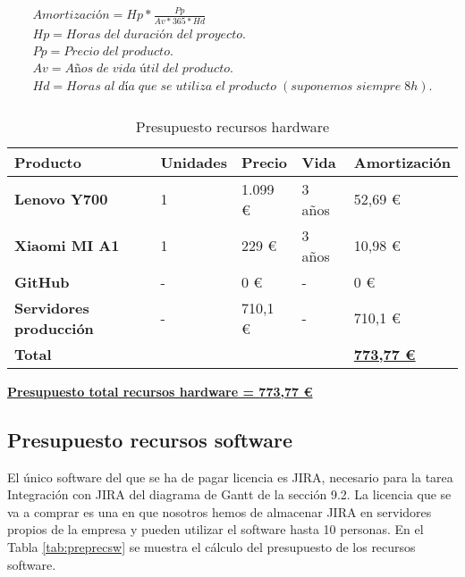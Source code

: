 \label{eq:amortizacion}
\begin{align*}
Amortización = Hp * \frac{Pp}{Av*365*Hd} \\
Hp = Horas \; del \; duración \; del \; proyecto. \\
Pp = Precio \; del \; producto. \\
Av = Años \; de \; vida \; útil \; del \; producto. \\
Hd = Horas \; al \; día \; que \; se \; utiliza \; el \; producto \; (suponemos \; siempre \; 8h). \\
\end{align*}

\begin{table}[H]\label{tab:preprechw}
	\centering
	\begin{tabular}{|l|l|l|l|l|}
		\hline
		\textbf{Producto}               & \textbf{Unidades} & \textbf{Precio} & \textbf{Vida} & \textbf{Amortización} \\ \hline
		\textbf{Lenovo Y700}            & 1                 & 1.099 € \cite{Tfg:ideapad} & 3 años        & 52,69 €               \\ \hline
		\textbf{Xiaomi MI A1}           & 1                 & 229 € \cite{Tfg:mia1}      & 3 años        & 10,98 €               \\ \hline
		\textbf{GitHub}                 & -                 & 0 €             & -             & 0 €                   \\ \hline
		\textbf{Servidores producción}  & -                 & 710,1 €         & -             & 710,1 €               \\ \hline
		\multicolumn{4}{|l|}{\textbf{Total}} & \textbf{\underline{773,77 €}}                                        \\ \hline
	\end{tabular}
	\caption{Presupuesto recursos hardware}
\end{table}

\textbf{\underline{Presupuesto total recursos hardware = 773,77 €}}

\subsection{Presupuesto recursos software}
El único software del que se ha de pagar licencia es JIRA, necesario para la tarea Integración con JIRA del diagrama de Gantt de la sección 9.2. La licencia que se va a comprar es una en que nosotros hemos de almacenar JIRA en servidores propios de la empresa y pueden utilizar el software hasta 10 personas. En el Tabla \ref{tab:preprecsw} se muestra el cálculo del presupuesto de los recursos software.

